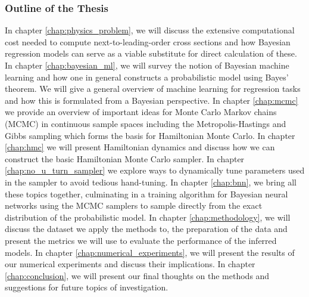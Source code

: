 \subsubsection*{Outline of the Thesis}
In chapter \ref{chap:physics_problem}, we will discuss the extensive computational cost needed to compute next-to-leading-order cross sections and how Bayesian regression models can serve as a viable substitute for direct calculation of these. In chapter \ref{chap:bayesian_ml}, we will survey the notion of Bayesian machine learning and how one in general constructs a probabilistic model using Bayes' theorem. We will give a general overview of machine learning for regression tasks and how this is formulated from a Bayesian perspective. In chapter \ref{chap:mcmc} we provide an overview of important ideas for Monte Carlo Markov chains (MCMC) in continuous sample spaces including the Metropolis-Hastings and Gibbs sampling which forms the basis for Hamiltonian Monte Carlo. In chapter \ref{chap:hmc} we will present Hamiltonian dynamics and discuss how we can construct the basic Hamiltonian Monte Carlo sampler. 
In chapter \ref{chap:no_u_turn_sampler} we explore ways to dynamically tune parameters used in the sampler to avoid tedious hand-tuning. In chapter \ref{chap:bnn}, we bring all these topics together, culminating in a training algorithm for Bayesian neural networks using the MCMC samplers to sample directly from the exact distribution of the probabilistic model. In chapter \ref{chap:methodology}, we will discuss the dataset we apply the methods to, the preparation of the data and present the metrics we will use to evaluate the performance of the inferred models. In chapter \ref{chap:numerical_experiments}, we will present the results of our numerical experiments and discuss their implications. In chapter \ref{chap:conclusion}, we will present our final thoughts on the methods and suggestions for future topics of investigation.


\begin{comment}
    The two most common classes are weight-space symmetry and scaling symmetry. The first symmetry refers to the case where two layers can be permuted and still produce the same prediction. The second symmetry arise when using non-linear function that obey $\sigma(\alpha x) = \alpha\sigma(x)$. The second symmetry can be removed entirely by avoidance of non-linear function of this form but the first symmetry is an unavoidable one. Thus many equivalent parameterizations exist which manifest itself as a multi-modal distribution that can be notoriously difficult to infer parameters from.
\end{comment}